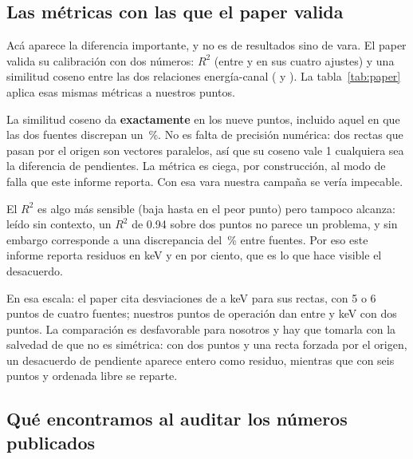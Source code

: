 \documentclass[11pt,a4paper]{article}
\begin{document}
\subsection{Las métricas con las que el paper valida}

Acá aparece la diferencia importante, y no es de resultados sino de vara. El
paper valida su calibración con dos números: $R^2$ (entre \RdosPaperMin{} y
\RdosPaperMax{} en sus cuatro ajustes) y una similitud coseno entre las dos
relaciones energía-canal (\CosenoPaperMin{} y \CosenoPaperMax). La
tabla~\ref{tab:paper} aplica esas mismas métricas a nuestros puntos.

\begin{table}[htbp]
\centering
\caption{Nuestros puntos, medidos con las métricas de validación del paper.}
\label{tab:paper}
{\small}
\end{table}

\begin{aviso}
La similitud coseno da \textbf{\CosenoNuestro{} exactamente} en los nueve
puntos, incluido aquel en que las dos fuentes discrepan un \DesacMax\,\%. No es
falta de precisión numérica: dos rectas que pasan por el origen son vectores
paralelos, así que su coseno vale 1 cualquiera sea la diferencia de pendientes.
La métrica es ciega, por construcción, al modo de falla que este informe
reporta. Con esa vara nuestra campaña se vería impecable.
\end{aviso}

El $R^2$ es algo más sensible (baja hasta \RdosNuestroMin{} en el peor punto)
pero tampoco alcanza: leído sin contexto, un $R^2$ de 0.94 sobre dos puntos no
parece un problema, y sin embargo corresponde a una discrepancia del
\DesacMax\,\% entre fuentes. Por eso este informe reporta residuos en keV y en
por ciento, que es lo que hace visible el desacuerdo.

En esa escala: el paper cita desviaciones de \SDPaperMin{} a \SDPaperMax{} keV
para sus rectas, con 5 o 6 puntos de cuatro fuentes; nuestros puntos de
operación dan entre \SDNuestroMin{} y \SDNuestroMax{} keV con dos puntos. La
comparación es desfavorable para nosotros y hay que tomarla con la salvedad de
que no es simétrica: con dos puntos y una recta forzada por el origen, un
desacuerdo de pendiente aparece entero como residuo, mientras que con seis
puntos y ordenada libre se reparte.

\subsection{Qué encontramos al auditar los números publicados}
\end{document}
